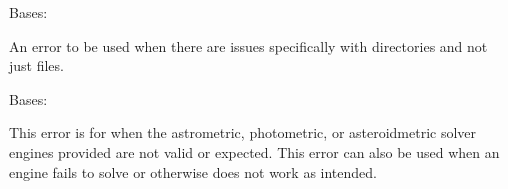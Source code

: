 \documentclass[letterpaper,11pt,english]{sphinxmanual}
\begin{document}

\begin{savenotes}\begin{fulllineitems}
\label{\detokenize{code/opihiexarata.library.error:opihiexarata.library.error.DirectoryError}}
\pysigstartsignatures
{}
\pysigstopsignatures
\sphinxAtStartPar
Bases: {\hyperref[\detokenize{code/opihiexarata.library.error:opihiexarata.library.error.ExarataException}]{}}

\sphinxAtStartPar
An error to be used when there are issues specifically with directories
and not just files.

\end{fulllineitems}\end{savenotes}


\begin{savenotes}\begin{fulllineitems}
\label{\detokenize{code/opihiexarata.library.error:opihiexarata.library.error.EngineError}}
\pysigstartsignatures
{}
\pysigstopsignatures
\sphinxAtStartPar
Bases: {\hyperref[\detokenize{code/opihiexarata.library.error:opihiexarata.library.error.ExarataException}]{}}

\sphinxAtStartPar
This error is for when the astrometric, photometric, or asteroid\sphinxhyphen{}metric
solver engines provided are not valid or expected. This error can also be
used when an engine fails to solve or otherwise does not work as
intended.

\end{fulllineitems}\end{savenotes}
\end{document}
